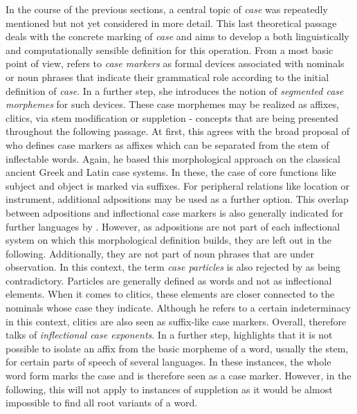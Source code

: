 \documentclass[11pt,a4paper,twoside,openright]{scrbook}
\begin{document}
In the course of the previous sections, a central topic of \textit{case} was repeatedly mentioned but not yet considered in more detail. This last theoretical passage deals with the concrete marking of \textit{case} and aims to develop a both linguistically and computationally sensible definition for this operation. From a most basic point of view, \citet{moravcsik2012hbocas} refers to \textit{case markers} as formal devices associated with nominals or noun phrases that indicate their grammatical role according to the initial definition of \textit{case}. In a further step, she introduces the notion of \textit{segmented case morphemes} for such devices. These case morphemes may be realized as affixes, clitics, via stem modification or suppletion - concepts that are being presented throughout the following passage. At first, this agrees with the broad proposal of \citet{blake1994case} who defines case markers as affixes which can be separated from the stem of inflectable words. Again, he based this morphological approach on the classical ancient Greek and Latin case systems. In these, the case of core functions like subject and object is marked via suffixes. For peripheral relations like location or instrument, additional adpositions may be used as a further option. This overlap between adpositions and inflectional case markers is also generally indicated for further languages by \citet{haspelmath2012hbocas}. However, as adpositions are not part of each inflectional system on which this morphological definition builds, they are left out in the following. Additionally, they are not part of noun phrases that are under observation. In this context, the term \textit{case particles} is also rejected by \citet{haspelmath2012hbocas} as being contradictory. Particles are generally defined as words and not as inflectional elements. When it comes to clitics, these elements are closer connected to the nominals whose case they indicate. Although he refers to a certain indeterminacy in this context, clitics are also seen as suffix-like case markers. Overall, \citet{haspelmath2012hbocas} therefore talks of \textit{inflectional case exponents}. In a further step, \citet{blake1994case} highlights that it is not possible to isolate an affix from the basic morpheme of a word, usually the stem, for certain parts of speech of several languages. In these instances, the whole word form marks the case and is therefore seen as a case marker. However, in the following, this will not apply to instances of suppletion as it would be almost impossible to find all root variants of a word.
\end{document}
